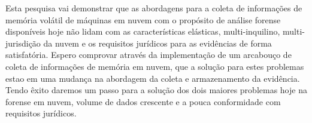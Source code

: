 \documentclass[12pt,				%
	openright,			%
	oneside,			%
	a4paper,			%
	english,			%
	brazil				%
	]{abntex2}
\begin{document}
\pagebreak

%
%

%


\setlength{\absparsep}{18pt} %
\begin{resumo}
Esta pesquisa vai demonstrar que as abordagens para a coleta de informações de memória volátil de máquinas em nuvem com o propósito de análise forense disponíveis hoje não 
lidam com as características elásticas, multi-inquilino, multi-jurisdição da nuvem e os requisitos jurídicos para as evidências de forma satisfatória. Espero comprovar através
da implementação de um arcabouço de coleta de informações de memória em nuvem, que a solução para estes problemas estao em uma mudança na abordagem da coleta e armazenamento 
da evidência. Tendo êxito daremos um passo para a solução dos dois maiores problemas hoje na forense em nuvem, volume de dados crescente e a pouca conformidade com requisitos jurídicos.

 

\end{resumo}

%
%  


\end{document}
